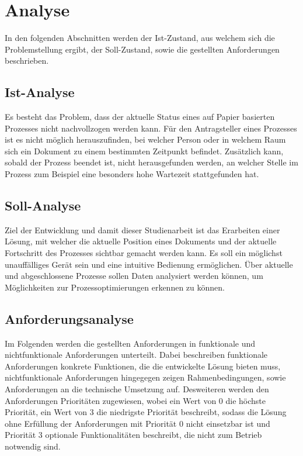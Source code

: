 \chapter{Analyse} \label{chap:analyse}

In den folgenden Abschnitten werden der Ist-Zustand, aus welchem sich die Problemstellung ergibt,
der Soll-Zustand, sowie die gestellten Anforderungen beschrieben.

\section{Ist-Analyse} \label{sec:ist-analyse}

Es besteht das Problem, dass der aktuelle Status eines auf Papier basierten Prozesses nicht nachvollzogen werden kann.
Für den Antragsteller eines Prozesses ist es nicht möglich herauszufinden, bei welcher Person oder in welchem Raum sich ein Dokument
zu einem bestimmten Zeitpunkt befindet.
Zusätzlich kann, sobald der Prozess beendet ist, nicht herausgefunden werden, an welcher Stelle im Prozess zum Beispiel eine besonders
hohe Wartezeit stattgefunden hat.

\section{Soll-Analyse} \label{sec:soll-analyse}

Ziel der Entwicklung und damit dieser Studienarbeit ist das Erarbeiten einer Lösung, mit welcher die aktuelle Position eines Dokuments und der aktuelle Fortschritt des Prozesses sichtbar gemacht werden kann.
Es soll ein möglichst unauffälliges Gerät sein und eine intuitive Bedienung ermöglichen.
Über aktuelle und abgeschlossene Prozesse sollen Daten analysiert werden können, um Möglichkeiten zur Prozessoptimierungen erkennen zu können.

\section{Anforderungsanalyse} \label{sec:anforderungsanalyse}

Im Folgenden werden die gestellten Anforderungen in funktionale und nichtfunktionale Anforderungen
unterteilt.
Dabei beschreiben funktionale Anforderungen konkrete Funktionen, die die entwickelte Lösung bieten
muss, nichtfunktionale Anforderungen hingegegen zeigen Rahmenbedingungen, sowie Anforderungen an die
technische Umsetzung auf.
Desweiteren werden den Anforderungen Prioritäten zugewiesen, wobei ein Wert von 0 die höchste
Priorität, ein Wert von 3 die niedrigste Priorität beschreibt, sodass die Lösung ohne Erfüllung der
Anforderungen mit Priorität 0 nicht einsetzbar ist und Priorität 3 optionale Funktionalitäten
beschreibt, die nicht zum Betrieb notwendig sind.

